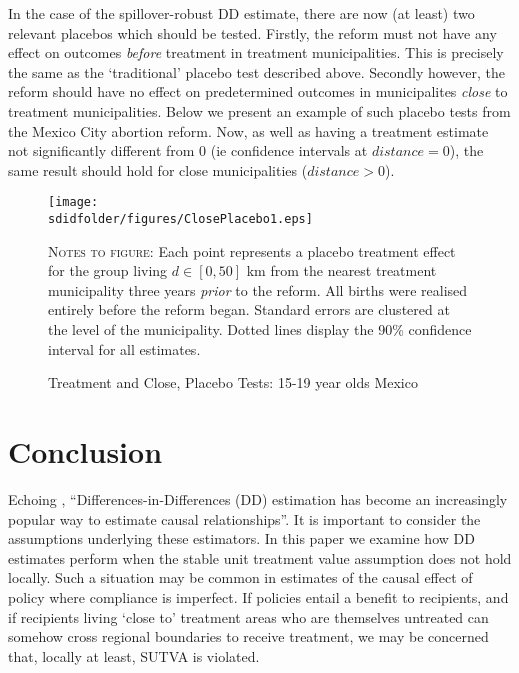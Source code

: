In the case of the spillover-robust DD estimate, there are now (at least) two
relevant placebos which should be tested.  Firstly, the reform must not have any
effect on outcomes \emph{before} treatment in treatment municipalities.  This is
precisely the same as the `traditional' placebo test described above.  Secondly
however, the reform should have no effect on predetermined outcomes in municipalites
\emph{close} to treatment municipalities.  Below we present an example of such 
placebo tests from the Mexico City abortion reform.  Now, as well as having a 
treatment estimate not significantly different from 0 (ie confidence intervals
at $distance=0$), the same result should hold for close municipalities ($distance>0$).
\begin{figure}[h!]
\texttt{[image: \\sdidfolder/figures/ClosePlacebo1.eps]}
\caption{Treatment and Close, Placebo Tests: 15-19 year olds Mexico}
\label{SFig:MexClose}
\vspace{2mm}
\begin{footnotesize}
\textsc{Notes to figure}: Each point represents a placebo treatment effect for the 
group living $d\in [0,50]$ km from the nearest treatment municipality three years
\emph{prior} to the reform.  All births were realised entirely before the reform
began.  Standard errors are clustered at the level of the municipality.  Dotted 
lines display the 90\% confidence interval for all estimates.
\end{footnotesize}
\end{figure}




\section{Conclusion}
Echoing \citet{Bertrandetal2004}, ``Differences-in-Differences (DD) estimation 
has become an increasingly popular way to estimate causal relationships''.  
It is important to consider the assumptions underlying these estimators.  
In this paper we examine how DD estimates perform when the stable unit treatment 
value assumption does not hold locally.  Such a situation may be common in estimates 
of the causal effect of policy where compliance is imperfect.  If policies entail a 
benefit to recipients, and if recipients living `close to' treatment areas who are 
themselves untreated can somehow cross regional boundaries to receive treatment, we 
may be concerned that, locally at least, SUTVA is violated.

